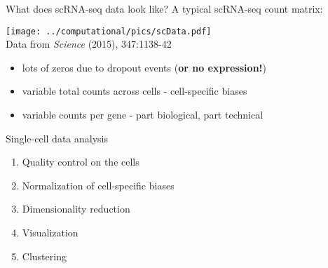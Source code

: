 \documentclass{beamer}
\begin{document}
\begin{frame}{What does scRNA-seq data look like?}
A typical scRNA-seq count matrix:
\begin{center}
\texttt{[image: ../computational/pics/scData.pdf]} \\
\vspace{-.1in}
{\tiny Data from \textit{Science} (2015), 347:1138-42}
\end{center}
\begin{itemize}
\item lots of zeros due to dropout events (\textbf{or no expression!})
\item variable total counts across cells - cell-specific biases
\item variable counts per gene - part biological, part technical
\end{itemize}
\end{frame}


\begin{frame}{Single-cell data analysis}
\begin{enumerate}
\item Quality control on the cells
\item Normalization of cell-specific biases
\item Dimensionality reduction
\item Visualization
\item Clustering
\end{enumerate}
\end{frame}
\end{document}
